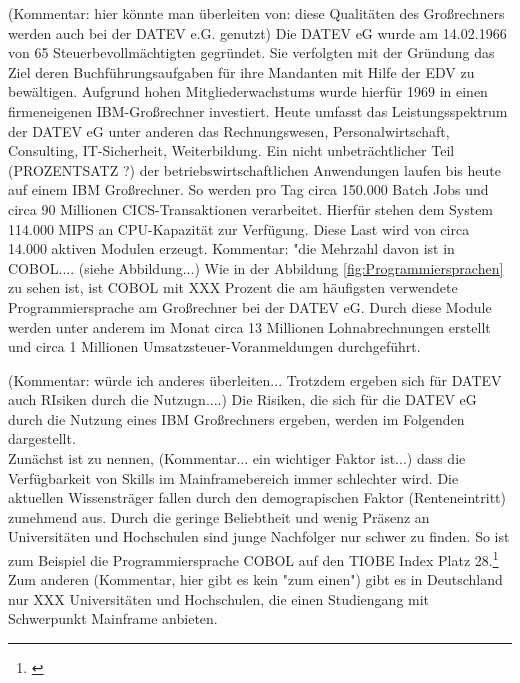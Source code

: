 (Kommentar: hier könnte man überleiten von: diese Qualitäten des Großrechners werden auch bei der DATEV e.G. genutzt)
Die DATEV eG wurde am 14.02.1966 von 65 Steuerbevollmächtigten gegründet.
Sie verfolgten mit der Gründung das Ziel deren Buchführungsaufgaben für ihre Mandanten mit Hilfe der EDV zu bewältigen.
Aufgrund hohen Mitgliederwachstums wurde hierfür 1969 in einen firmeneigenen IBM-Großrechner investiert.\cite{DATEVeG.2017}
Heute umfasst das Leistungsspektrum der DATEV eG unter anderen das Rechnungswesen, Personalwirtschaft, Consulting, IT-Sicherheit, Weiterbildung.
Ein nicht unbeträchtlicher Teil (PROZENTSATZ ?) der betriebswirtschaftlichen Anwendungen laufen bis heute auf einem IBM Großrechner.
So werden pro Tag circa 150.000 Batch Jobs und circa 90 Millionen CICS-Transaktionen verarbeitet.
Hierfür stehen dem System 114.000 MIPS an CPU-Kapazität zur Verfügung.
Diese Last wird von circa 14.000 aktiven Modulen erzeugt.
Kommentar: "die Mehrzahl davon ist in COBOL.... (siehe Abbildung...)
Wie in der Abbildung \ref{fig:Programmiersprachen} zu sehen ist, ist COBOL mit XXX Prozent die am häufigsten verwendete Programmiersprache am Großrechner bei der DATEV eG.
Durch diese Module werden unter anderem im Monat circa 13 Millionen Lohnabrechnungen erstellt und circa 1 Millionen Umsatzsteuer-Voranmeldungen durchgeführt.

(Kommentar: würde ich anderes überleiten... Trotzdem ergeben sich für DATEV auch RIsiken durch die Nutzugn....)
Die Risiken, die sich für die DATEV eG durch die Nutzung eines IBM Großrechners ergeben, werden im Folgenden dargestellt.\\
Zunächst ist zu nennen, (Kommentar... ein wichtiger Faktor ist...) dass die Verfügbarkeit von Skills im Mainframebereich immer schlechter wird.
Die aktuellen Wissensträger fallen durch den demograpischen Faktor (Renteneintritt)  zunehmend aus.
Durch die geringe Beliebtheit und wenig Präsenz an Universitäten und Hochschulen sind junge Nachfolger nur schwer zu finden.
So ist zum Beispiel die Programmiersprache COBOL auf den TIOBE Index Platz 28.\footnote{\cite{TIOBESoftwareBV.25.11.2019}}
Zum anderen (Kommentar, hier gibt es kein "zum einen") gibt es in Deutschland nur XXX Universitäten und Hochschulen, die einen Studiengang mit Schwerpunkt Mainframe anbieten.\cite{fehlt noch}

